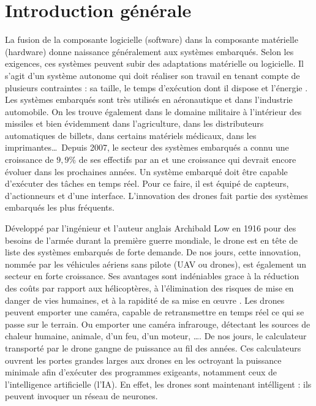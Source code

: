\chapter*{Introduction générale}
La fusion de la composante logicielle (software) dans la composante matérielle (hardware) donne naissance généralement aux systèmes embarqués.
Selon les exigences, ces systèmes peuvent subir des adaptations matérielle ou logicielle. Il s'agit d'un système autonome qui doit réaliser son travail en tenant compte de plusieurs contraintes : sa taille, le temps d'exécution dont il dispose et l'énergie \cite{FUTURA}. Les systèmes embarqués sont très utilisés en aéronautique et dans l'industrie automobile. On les trouve également dans le domaine militaire à l'intérieur des missiles et bien évidemment dans l'agriculture, dans les distributeurs automatiques de billets, dans certains matériels médicaux, dans les imprimantes\ldots\  Depuis 2007, le secteur des systèmes embarqués a connu une croissance de $9,9\%$ de ses effectifs par an \cite{PierreAudoin2012} et une croissance qui devrait encore évoluer dans les prochaines années. Un système embarqué doit être capable d'exécuter des tâches en temps réel. Pour ce faire, il est équipé de capteurs, d'actionneurs et d'une interface. L'innovation des drones fait partie des systèmes embarqués les plus fréquents. 

Développé par l'ingénieur et l'auteur anglais Archibald Low en 1916 pour des besoins de l'armée durant la première guerre mondiale, le drone est en tête de liste des systèmes embarqués de forte demande\cite{STUDIOFLY}. 
De nos jours, cette innovation, nommée par les véhicules aériens sans pilote (UAV ou drones), est également un secteur en forte croissance. 
Ses avantages sont indéniables grace à la réduction des coûts par rapport aux hélicoptères, à l'élimination des risques de mise en danger de vies humaines, et à la rapidité de sa mise en œuvre \cite{AltiGator}. 
Les drones peuvent emporter une caméra, capable de retransmettre en temps réel ce qui se passe sur le terrain. 
Ou emporter une caméra infrarouge, détectant les sources de chaleur humaine, animale, d'un feu, d'un moteur, \ldots .
De nos jours, le calculateur transporté par le drone gangne de puissance au fil des années. Ces calculateurs ouvrent les portes grandes larges aux drones en les octroyant la puissance minimale afin d'exécuter des programmes exigeants, notamment ceux de l'intelligence artificielle (l'IA). En effet, les drones sont maintenant intélligent : ils peuvent invoquer un réseau de neurones.

